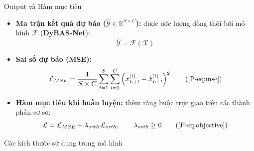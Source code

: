 \documentclass [xcolor=svgnames, notes] {beamer}
\begin{document}
\begin{frame}{Output và Hàm mục tiêu}
    \begin{itemize}
        \item \textbf{Ma trận kết quả dự báo ($\hat{\mathcal{Y}} \in \mathbb{R}^{S \times C}$):} được ước lượng đồng thời
              bởi mô hình $\mathcal{F}$ (\textbf{DyBAS-Net}):
        $$\hat{\mathcal{Y}} = \mathcal{F}(\mathcal{X})$$

        \item \textbf{Sai số dự báo (MSE):}
        \[ \mathcal{L}_{MSE} = \frac{1}{S \times C} \sum_{t=1}^{S} \sum_{i=1}^{C} \left( x_{L+t}^{(i)} - \hat{x}_{L+t}^{(i)} \right)^2 \tag{\ref*{P-eq:mse}}\]

        \item \textbf{Hàm mục tiêu khi huấn luyện:} thêm ràng buộc trực giao trên các thành phần cơ sở:
        \[\mathcal{L} = \mathcal{L}_{MSE} + \lambda_{orth}\,\mathcal{L}_{orth}, \qquad \lambda_{orth}\ge 0 \tag{\ref*{P-eq:objective}}\]
    \end{itemize}
\end{frame}

\begin{frame}{Các kích thước sử dụng trong mô hình}
\begin{center}
\end{center}
\end{frame}
\end{document}
